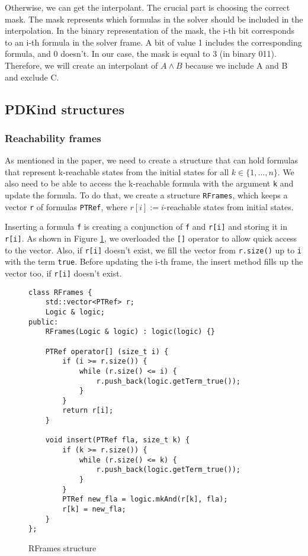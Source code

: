 Otherwise, we can get the interpolant. The crucial part is choosing the correct mask. The mask represents which formulas in the solver should be included in the interpolation. In the binary representation of the mask, the i-th bit corresponds to an i-th formula in the solver frame. A bit of value 1 includes the corresponding formula, and 0 doesn't. In our case, the mask is equal to 3 (in binary 011). Therefore, we will create an interpolant of $A \wedge B$ because we include A and B and exclude C.


\subsection{PDKind structures}


\subsubsection{Reachability frames}
\noindent As mentioned in the paper\cite{7886665}, we need to create a structure that can hold formulas that represent k-reachable states from the initial states for all $k \in \{1,\dots,n\}$. We also need to be able to access the k-reachable formula with the argument \texttt{k} and update the formula. To do that, we create a structure \texttt{RFrames}, which keeps a vector \texttt{r} of formulas \texttt{PTRef}, where $r[i] := i$-reachable states from initial states. 

Inserting a formula \texttt{f} is creating a conjunction of \texttt{f} and \texttt{r[i]} and storing it in \texttt{r[i]}. As shown in Figure \ref{code:RFrames}, we overloaded the \texttt{[]} operator to allow quick access to the vector. Also, if \texttt{r[i]} doesn't exist, we fill the vector from \texttt{r.size()} up to \texttt{i} with the term \texttt{true}. Before updating the i-th frame, the insert method fills up the vector too, if \texttt{r[i]} doesn't exist.

\begin{figure}[H]
\begin{lstlisting}
class RFrames {
    std::vector<PTRef> r;
    Logic & logic;
public:
    RFrames(Logic & logic) : logic(logic) {}

    PTRef operator[] (size_t i) {
        if (i >= r.size()) {
            while (r.size() <= i) {
                r.push_back(logic.getTerm_true());
            }
        }
        return r[i];
    }

    void insert(PTRef fla, size_t k) {
        if (k >= r.size()) {
            while (r.size() <= k) {
                r.push_back(logic.getTerm_true());
            }
        }
        PTRef new_fla = logic.mkAnd(r[k], fla);
        r[k] = new_fla;
    }
};
\end{lstlisting}
\caption{RFrames structure}\label{code:RFrames}
\end{figure}


